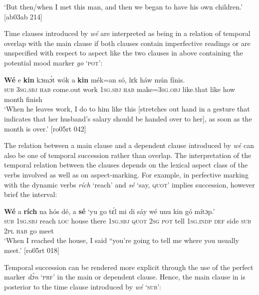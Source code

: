 \glt ‘But then/when I met this man, and then we began to have his
own children.’ [ab03ab 214]
\z

Time clauses introduced by \textit{wé} are interpreted as being in a relation of temporal overlap with the main clause if both clauses contain imperfective readings  or are unspecified with respect to aspect like the two clauses in  above containing the potential mood marker \textit{go} ‘\textsc{pot}’:


\ea%
    \label{ex:key:1460}
    \gll \textbf{Wé}  e    \textbf{kin}  kɔmɔ́t    wók    a    \textbf{kin}  mék=an    só,
lɛk  háw    mún    fínis.\\
\textsc{sub}  \textsc{3sg.sbj}  \textsc{hab}  come.out  work  \textsc{1sg.sbj}  \textsc{hab}  make=\textsc{3sg.obj}  like.that
like  how    month  finish\\

\glt ‘When he leaves work, I do to him like this [stretches out hand in a gesture
that indicates that her husband’s salary should be handed over to her], 
as soon as the month is over.’ [ro05rt 042]
\z

The relation between a main clause and a dependent clause introduced by \textit{wé} can also be one of temporal succession rather than overlap. The interpretation of the temporal relation between the clauses depends on the lexical aspect class of the verbs involved as well as on aspect-marking. For example, in  perfective marking with the dynamic verbs \textit{rích} ‘reach’ and \textit{sé} ‘say, \textsc{quot’} implies succession, however brief the interval:


\ea%
    \label{ex:key:1461}
    \gll \textbf{Wé}  a    \textbf{rích}    na  hós    dé,    a    \textbf{sé}  
‘yu  go  tɛ́l  mi    di  sáy  wé  unu  kin  gó  mítɔp.’\\
\textsc{sub}  \textsc{1sg.sbj}  reach  \textsc{loc}  house  there  \textsc{1sg.sbj}  \textsc{quot}  
\textsc{2sg}  \textsc{pot}  tell  \textsc{1sg.indp}  \textsc{def}  side  \textsc{sub}  \textsc{2pl}  \textsc{hab}  go  meet\\

\glt ‘When I reached the house, I said “you’re going to tell me where 
you usually meet.’ [ro05rt 018]
\z

Temporal succession can be rendered more explicit through the use of the perfect marker \textit{dɔ́n} ‘\textsc{prf’} in the main or dependent clause. Hence, the main clause in  is posterior to the time clause introduced by \textit{wé} ‘\textsc{sub}’:


